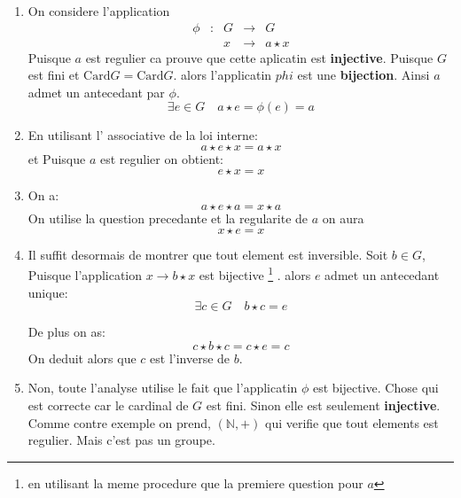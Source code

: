 \documentclass{report}
\begin{document}
\begin{myproof}
  \begin{enumerate}
    \item On considere l'application
      $$
      \begin{array}{lllll}
        \phi & : & G & \longrightarrow & G\\
             &   & x & \longrightarrow & a \star x
      \end{array}
      $$
      Puisque $a$ est regulier ca prouve que cette aplicatin est \textbf{injective}. Puisque $G$ est fini et $\text{Card} G = \text{Card} G$. alors l'applicatin $phi$ est une \textbf{bijection}.
      Ainsi $a$ admet un antecedant par $\phi$.
      $$
      \exists e \in G \quad a \star e = \phi(e) = a
      $$
    \item En utilisant l' associative de la loi interne:
      $$
      a \star e \star x = a \star x 
      $$
      et Puisque $a$ est regulier on obtient:
      $$
      e \star x = x
      $$
    \item On a:
      $$
      a \star e \star a = x \star a
      $$
      On utilise la question precedante et la regularite de $a$ on aura
      $$
      x \star e = x
      $$
    \item Il suffit desormais de montrer que tout element est inversible. Soit $b\in G$, Puisque l'application $x \rightarrow b \star x$  est bijective \footnote{en utilisant la meme procedure que la premiere question pour $a$} . alors $e$ admet un antecedant unique:
      $$
      \exists c \in G \quad b \star c = e
      $$
      
      De plus on as:
      $$
      c \star b \star c = c \star e = c
      $$
      On deduit alors que $c$ est l'inverse de $b$.
    \item Non, toute l'analyse utilise le fait que l'applicatin $\phi$ est bijective. Chose qui est correcte car le cardinal de $G$ est fini. Sinon elle est seulement \textbf{injective}. Comme contre exemple on prend, $(\mathbb{N}, +)$ qui verifie que tout elements est regulier. Mais c'est pas un groupe.
  \end{enumerate}

\end{myproof}
\end{document}
